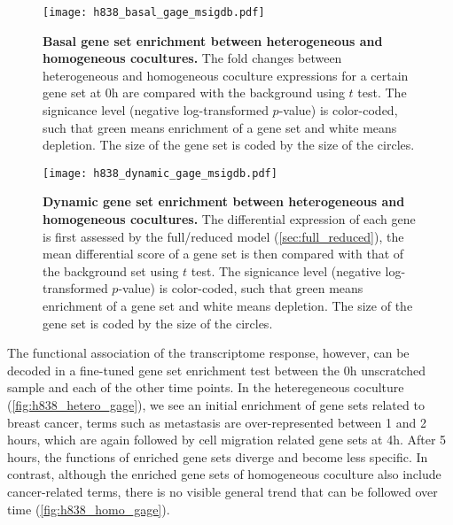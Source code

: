 \begin{figure}[!ht]
\begin{center}
\texttt{[image: h838\_basal\_gage\_msigdb.pdf]}
\end{center}
\caption[Basal gene set enrichment]{
{\bf Basal gene set enrichment between heterogeneous and homogeneous cocultures.} 
The fold changes between heterogeneous and homogeneous coculture expressions 
for a certain gene set at 0h are compared with the background using $t$ test.
The signicance level (negative log-transformed $p$-value) is color-coded, such
that green means enrichment of a gene set and white means depletion. The size
of the gene set is coded by the size of the circles.
}
\label{fig:h838_basal_gage_msigdb}
\end{figure}

\begin{figure}[!ht]
\begin{center}
\texttt{[image: h838\_dynamic\_gage\_msigdb.pdf]}
\end{center}
\caption[Dynamic gene set enrichment]{
{\bf Dynamic gene set enrichment between heterogeneous and homogeneous 
cocultures.} 
The differential expression of each gene is first assessed by the full/reduced
model (\ref{sec:full_reduced}), the mean differential score of a gene set
is then compared with that of the background set using $t$ test.
The signicance level (negative log-transformed $p$-value) is color-coded, such
that green means enrichment of a gene set and white means depletion. The size
of the gene set is coded by the size of the circles.
}
\label{fig:h838_dynamic_gage_msigdb}
\end{figure}

The functional association of the transcriptome response, however, can be
decoded in a fine-tuned gene set enrichment test between the 0h unscratched
sample and each of the other time points. In the heteregeneous coculture 
(\ref{fig:h838_hetero_gage}),
we see an initial enrichment of gene sets related to breast cancer, terms
such as metastasis are over-represented between 1 and 2 hours, which are
again followed by cell migration related gene sets at 4h. After 5 hours,
the functions of enriched gene sets diverge and become less specific.
In contrast, although the enriched gene sets of homogeneous coculture also 
include cancer-related terms, there is no visible general trend that can
be followed over time (\ref{fig:h838_homo_gage}). 

